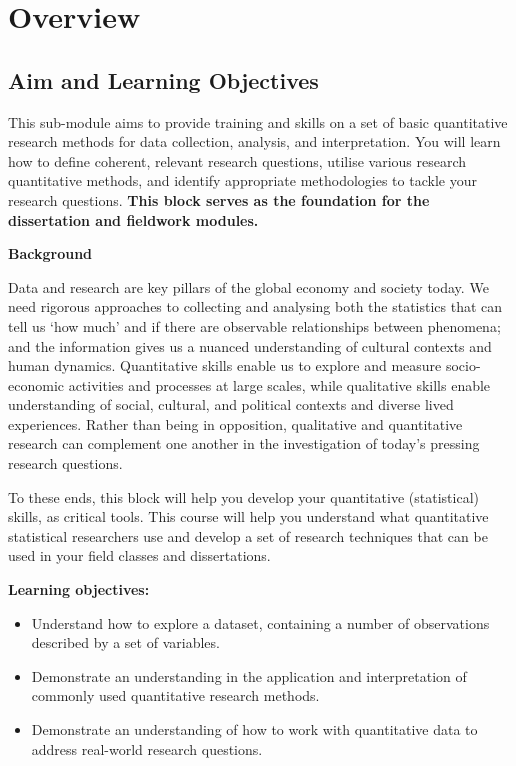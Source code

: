 \documentclass[
  letterpaper,
  DIV=11,
  numbers=noendperiod]{scrreprt}
\providecommand{\tightlist}{%
  \setlength{\itemsep}{0pt}\setlength{\parskip}{0pt}}
\begin{document}

\chapter*{Overview}\label{overview}


\section*{Aim and Learning
Objectives}\label{aim-and-learning-objectives}


This sub-module aims to provide training and skills on a set of basic
quantitative research methods for data collection, analysis, and
interpretation. You will learn how to define coherent, relevant research
questions, utilise various research quantitative methods, and identify
appropriate methodologies to tackle your research questions.
\textbf{This block serves as the foundation for the dissertation and
fieldwork modules.}

\textbf{Background}

Data and research are key pillars of the global economy and society
today. We need rigorous approaches to collecting and analysing both the
statistics that can tell us `how much' and if there are observable
relationships between phenomena; and the information gives us a nuanced
understanding of cultural contexts and human dynamics. Quantitative
skills enable us to explore and measure socio-economic activities and
processes at large scales, while qualitative skills enable understanding
of social, cultural, and political contexts and diverse lived
experiences. Rather than being in opposition, qualitative and
quantitative research can complement one another in the investigation of
today's pressing research questions.

To these ends, this block will help you develop your quantitative
(statistical) skills, as critical tools. This course will help you
understand what quantitative statistical researchers use and develop a
set of research techniques that can be used in your field classes and
dissertations.

\textbf{Learning objectives:}

\begin{itemize}
\tightlist
\item
  Understand how to explore a dataset, containing a number of
  observations described by a set of variables.
\item
  Demonstrate an understanding in the application and interpretation of
  commonly used quantitative research methods.
\item
  Demonstrate an understanding of how to work with quantitative data to
  address real-world research questions.
\end{itemize}
\end{document}
